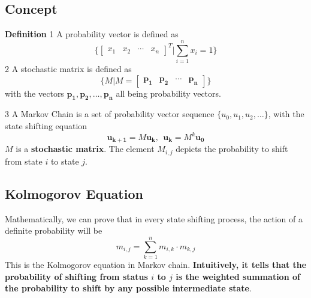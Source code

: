 \documentclass[11pt]{article}
\begin{document}
\subsection{Concept}
\textbf{Definition} \textcircled{\tiny{1}} A probability vector is defined as
\begin{equation}
    \{ \begin{bmatrix}
    x_1 & x_2 & \cdots & x_n
    \end{bmatrix}^{T} | \sum_{i=1}^{n}x_{i} = 1 \}
\end{equation}
\textcircled{\tiny{2}} A stochastic matrix is defined as
\begin{equation}
    \{M | M = \begin{bmatrix}
    \bm{p_1} & \bm{p_2} & \cdots & \bm{p_n} 
    \end{bmatrix}  \}
\end{equation}
with the vectors $\bm{p_1},\bm{p_2},\dots,\bm{p_n}$ all being probability vectors. \par \indent \par \noindent
\textcircled{\tiny{3}} A Markov Chain is a set of probability vector sequence $\{u_0,u_1, u_2, \dots\}$, with the state shifting equation
\begin{equation}
    \bm{u_{k+1}} = M \bm{u_k},~~\bm{u_k} = M^{k}\bm{u_0}
\end{equation}
$M$ is a \textbf{stochastic matrix}. The element $M_{i,j}$ depicts the probability to shift from state $i$ to state $j$.
\subsection{Kolmogorov Equation}
Mathematically, we can prove that in every state shifting process, the action of a definite probability will be
\begin{equation}
    m_{i,j} = \sum_{k=1}^{n}m_{i,k}\cdot m_{k,j}
\end{equation}
This is the Kolmogorov equation in Markov chain. \textbf{Intuitively, it tells that the probability of shifting from status $i$ to $j$ is the weighted summation of the probability to shift by any possible intermediate state}.
\end{document}
